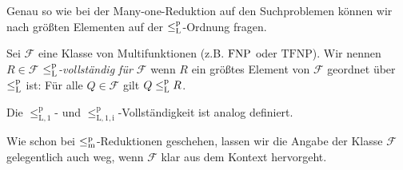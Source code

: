 Genau so wie bei der Many-one-Reduktion auf den Suchproblemen können wir nach größten Elementen auf der $\leq_\mathrm{L}^\mathrm{p}$-Ordnung fragen.

\begin{definition}
    Sei $\mathcal F$ eine Klasse von Multifunktionen (z.B. $\mathrm{FNP}$ oder $\mathrm{TFNP}$).
    Wir nennen $R\in\mathcal F$ \emph{$\leq_\mathrm{L}^\mathrm{p}$-vollständig für $\mathcal F$} wenn $R$ ein größtes Element von $\mathcal F$ geordnet über $\leq_\mathrm{L}^\mathrm{p}$ ist:
    Für alle $Q\in\mathcal F$ gilt $Q\leq_\mathrm{L}^\mathrm{p} R$.

    Die $\leq_\mathrm{L,1}^\mathrm p$- und $\leq_\mathrm{L,1,i}^\mathrm p$-Vollständigkeit ist analog definiert.
\end{definition}
Wie schon bei $\leq_\mathrm{m}^\mathrm{p}$-Reduktionen geschehen, lassen wir die Angabe der Klasse $\mathcal F$ gelegentlich auch weg, wenn $\mathcal F$ klar aus dem Kontext hervorgeht.

